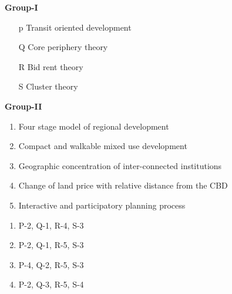 \documentclass[journal,12pt,onecolumn]{IEEEtran}
\theoremstyle{remark}
\begin{document}
 \begin{multicols}{2}
     
 
\hspace{1cm} \textbf{Group-I}
\begin{enumerate}[label=( \Alph*) ,leftmargin=1.5cm]
    \item[p] \hspace{0.2cm} Transit oriented development
    \item [Q] \hspace{0.2cm} Core periphery theory
    \item [R] \hspace{0.2cm} Bid rent theory
    \item [S] \hspace{0.2cm} Cluster theory
\end{enumerate}
\columnbreak
\noindent
\hspace{1cm} \textbf{Group-II}
\begin{enumerate}
    \item Four stage model of regional development
    \item Compact and walkable mixed use development
    \item Geographic concentration of inter-connected institutions
    \item Change of land price with relative distance from the CBD
    \item Interactive and participatory planning process
\end{enumerate}
\end{multicols}

\vspace{0.5cm}
\begin{multicols}{2}
    

\begin{enumerate}[label=(\Alph*),leftmargin=1.5cm]
    \item P-2, Q-1, R-4, S-3
    \item P-2, Q-1, R-5, S-3
    \item P-4, Q-2, R-5, S-3
    \item P-2, Q-3, R-5, S-4
\end{enumerate}
\end{multicols}
\vspace{0.5cm}
\end{document}

